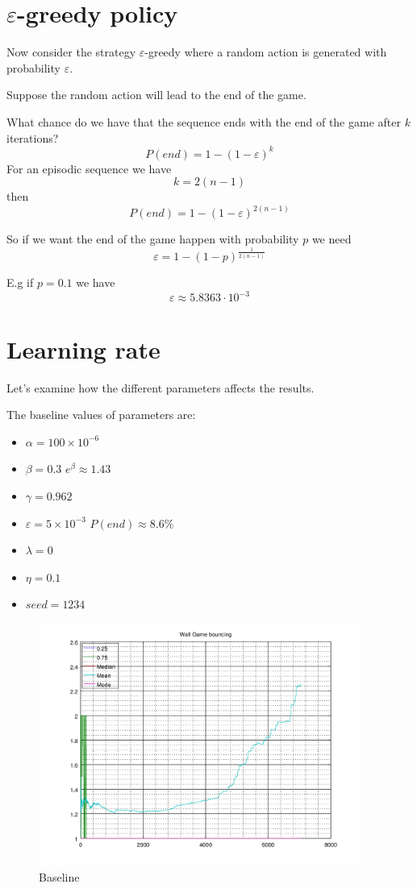 \documentclass[a4paper,11pt]{article}
\begin{document}
\section{$\varepsilon$-greedy policy}

Now consider the strategy $ \varepsilon $-greedy where a random action is generated with probability $ \varepsilon $.

Suppose the random action will lead to the end of the game.

What chance do we have that the sequence ends with the end of the game after $ k $ iterations?
\[
P(end) = 1 - (1 - \varepsilon) ^ k
\]
For an episodic sequence we have 
\[ k = 2 (n-1) \]
then
\[
P(end) = 1 - (1 - \varepsilon) ^ {2(n-1)}
\]

So if we want the end of the game happen with probability $ p $ we need 
\[
\varepsilon = 1- (1 - p) ^ \frac{1}{2(n-1)}
\]

E.g if $ p = 0.1 $ we have
\[
\varepsilon \approx 5.8363 \cdot 10^{-3}
\]

\section{Learning rate}
Let's examine how the different parameters affects the results.


The baseline values of parameters are:
\begin{itemize}
	\item $\alpha = 100 \times 10^{-6} $
	\item $\beta = 0.3 $ $e^\beta \approx 1.43 $
	\item $\gamma = 0.962 $
	\item $\varepsilon = 5 \times 10^{-3} $ $ P(end) \approx 8.6 \%$
	\item $\lambda = 0 $
	\item $\eta = 0.1 $
	\item $ seed = 1234 $
\end{itemize}
\begin{figure}
	\label{fig:baselines}
	\includegraphics[width=300pt]{baseline}
	\caption{Baseline}
\end{figure}
\end{document}
